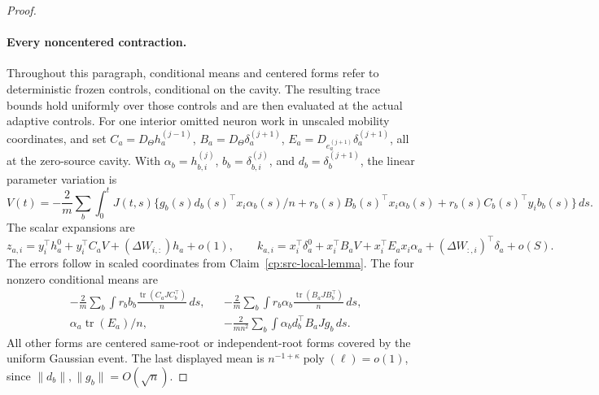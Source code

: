\begin{proof}
\paragraph{Every noncentered contraction.}
Throughout this paragraph, conditional means and centered forms refer
to deterministic frozen controls, conditional on the cavity. The
resulting trace bounds hold uniformly over those controls and are
then evaluated at the actual adaptive controls.
For one interior omitted neuron work in unscaled mobility coordinates,
and set \(C_a=D_\Theta h_a^{(j-1)}\),
\(B_a=D_\Theta\delta_a^{(j+1)}\),
\(E_a=D_{e_a^{(j+1)}}\delta_a^{(j+1)}\), all at the zero-source
cavity.  With \(\alpha_b=h_{b,i}^{(j)}\),
\(b_b=\delta_{b,i}^{(j)}\), and \(d_b=\delta_b^{(j+1)}\),
the linear parameter variation is
\[
 V(t)=-\frac2m\sum_b\int_0^tJ(t,s)
 \{g_b(s)d_b(s)^\top x_i\alpha_b(s)/n
       +r_b(s)B_b(s)^\top x_i\alpha_b(s)
       +r_b(s)C_b(s)^\top y_i b_b(s)\}\,ds.
\]
The scalar expansions are
\[
 z_{a,i}=y_i^\top h_a^0+y_i^\top C_aV
                      +(\Delta W_{i,:})h_a+o(1),\qquad
 k_{a,i}=x_i^\top\delta_a^0+x_i^\top B_aV
                  +x_i^\top E_ax_i\alpha_a
                  +(\Delta W_{:,i})^\top\delta_a+o(S).
\]
The errors follow in scaled coordinates from
Claim~\ref{cp:src-local-lemma}.  The four nonzero conditional means are
\begin{align}
 &-\frac2m\sum_b\int r_bb_b
           \frac{\operatorname{tr}(C_aJ C_b^\top)}n\,ds,
 &&-\frac2m\sum_b\int r_b\alpha_b
           \frac{\operatorname{tr}(B_aJ B_b^\top)}n\,ds,\nonumber\\
 &\alpha_a\operatorname{tr}(E_a)/n,
 &&-\frac2{mn^2}\sum_b\int\alpha_b d_b^\top B_aJg_b\,ds.
 \label{cp:src-traces}
\end{align}
All other forms are centered same-root or independent-root forms
covered by the uniform Gaussian event.  The last displayed mean is
\(n^{-1+\kappa}\operatorname{poly}(\ell)=o(1)\), since
\(\|d_b\|,\|g_b\|=O(\sqrt n)\).


\end{proof}
